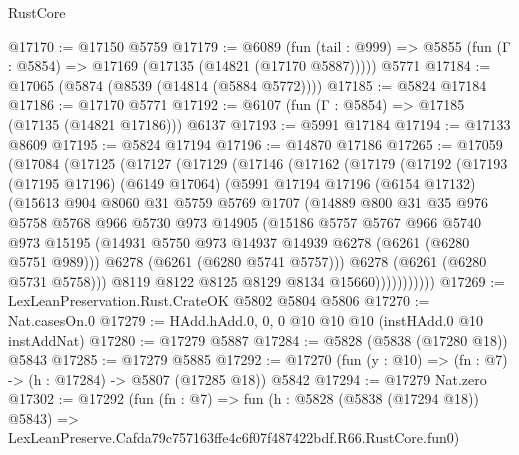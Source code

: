 \begin{lexlean}{RustCore}
\begin{coremodule}
@17170 := @17150 @5759
@17179 := @6089
    (fun (tail : @999) => @5855 (fun (Γ : @5854) => @17169 (@17135 (@14821 (@17170 @5887)))))
    @5771
@17184 := @17065 (@5874 (@8539 (@14814 (@5884 @5772))))
@17185 := @5824 @17184
@17186 := @17170 @5771
@17192 := @6107 (fun (Γ : @5854) => @17185 (@17135 (@14821 @17186))) @6137
@17193 := @5991 @17184
@17194 := @17133 @8609
@17195 := @5824 @17194
@17196 := @14870 @17186
@17265 := @17059
    (@17084
      (@17125
        (@17127
          (@17129
            (@17146
              (@17162
                (@17179
                  (@17192
                    (@17193
                      (@17195 @17196)
                      (@6149 @17064)
                      (@5991
                        @17194
                        @17196
                        (@6154 @17132)
                        (@15613
                          @904
                          @8060
                          @31
                          @5759
                          @5769
                          @1707
                          (@14889
                            @800
                            @31
                            @35
                            @976
                            @5758
                            @5768
                            @966
                            @5730
                            @973
                            @14905
                            (@15186
                              @5757
                              @5767
                              @966
                              @5740
                              @973
                              @15195
                              (@14931 @5750 @973 @14937 @14939 @6278 (@6261 (@6280 @5751 @989)))
                              @6278
                              (@6261 (@6280 @5741 @5757)))
                            @6278
                            (@6261 (@6280 @5731 @5758)))
                          @8119
                          @8122
                          @8125
                          @8129
                          @8134
                          @15660)))))))))))
@17269 := LexLeanPreservation.Rust.CrateOK @5802 @5804 @5806
@17270 := Nat.casesOn.{0}
@17279 := HAdd.hAdd.{0, 0, 0} @10 @10 @10 (instHAdd.{0} @10 instAddNat)
@17280 := @17279 @5887
@17284 := @5828 (@5838 (@17280 @18)) @5843
@17285 := @17279 @5885
@17292 := @17270 (fun (y : @10) => (fn : @7) -> (h : @17284) -> @5807 (@17285 @18)) @5842
@17294 := @17279 Nat.zero
@17302 := @17292
    (fun (fn : @7) =>
    fun (h : @5828 (@5838 (@17294 @18)) @5843) =>
    LexLeanPreserve.Cafda79c757163ffe4c6f07f487422bdf.R66.RustCore.fun0)

\end{coremodule}
\end{lexlean}
